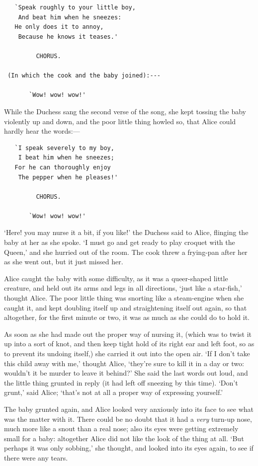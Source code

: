 \documentclass[12pt,openany]{memoir}
\begin{document}
\begin{verbatim}
   `Speak roughly to your little boy,
    And beat him when he sneezes:
   He only does it to annoy,
    Because he knows it teases.'

         CHORUS.

 (In which the cook and the baby joined):---

       `Wow! wow! wow!'
\end{verbatim}

While the Duchess sang the second verse of the song, she kept tossing the baby violently up and down, and the poor little thing howled so, that Alice could hardly hear the words:---

\begin{verbatim}
   `I speak severely to my boy,
    I beat him when he sneezes;
   For he can thoroughly enjoy
    The pepper when he pleases!'

         CHORUS.

       `Wow! wow! wow!'
\end{verbatim}

`Here! you may nurse it a bit, if you like!' the Duchess said to Alice, flinging the baby at her as she spoke. `I must go and get ready to play croquet with the Queen,' and she hurried out of the room. The cook threw a frying-pan after her as she went out, but it just missed her.

Alice caught the baby with some difficulty, as it was a queer-shaped little creature, and held out its arms and legs in all directions, `just like a star-fish,' thought Alice. The poor little thing was snorting like a steam-engine when she caught it, and kept doubling itself up and straightening itself out again, so that altogether, for the first minute or two, it was as much as she could do to hold it.

As soon as she had made out the proper way of nursing it, (which was to twist it up into a sort of knot, and then keep tight hold of its right ear and left foot, so as to prevent its undoing itself,) she carried it out into the open air. `If I don't take this child away with me,' thought Alice, `they're sure to kill it in a day or two: wouldn't it be murder to leave it behind?' She said the last words out loud, and the little thing grunted in reply (it had left off sneezing by this time). `Don't grunt,' said Alice; `that's not at all a proper way of expressing yourself.'

The baby grunted again, and Alice looked very anxiously into its face to see what was the matter with it. There could be no doubt that it had a \textit{very} turn-up nose, much more like a snout than a real nose; also its eyes were getting extremely small for a baby: altogether Alice did not like the look of the thing at all. `But perhaps it was only sobbing,' she thought, and looked into its eyes again, to see if there were any tears.
\end{document}
